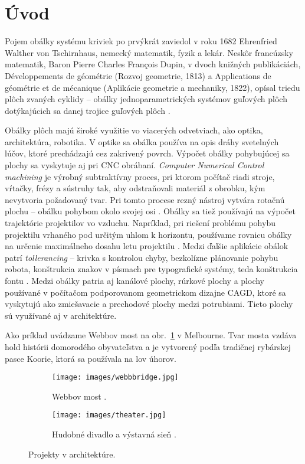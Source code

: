 \chapter*{Úvod} %
Pojem obálky systému kriviek po prvýkrát zaviedol v roku 1682 Ehrenfried Walther von Tschirnhaus, nemecký matematik, fyzik a lekár. Neskôr francúzsky matematik, Baron Pierre Charles François Dupin, v dvoch knižných publikáciách, Développements de géométrie (Rozvoj geometrie, 1813) a Applications de géométrie et de mécanique (Aplikácie geometrie a mechaniky, 1822), opísal triedu plôch zvaných cyklidy – obálky jednoparametrických systémov guľových plôch dotýkajúcich sa danej trojice guľových plôch \cite{Ciz2017}.

Obálky plôch majú široké využitie vo viacerých odvetviach, ako optika, architektúra, robotika. V optike sa obálka používa na opis dráhy svetelných lúčov, ktoré prechádzajú cez zakrivený povrch. Výpočet obálky pohybujúcej sa plochy sa vyskytuje aj pri CNC obrábaní. \textit{Computer Numerical Control machining} je výrobný subtraktívny proces, pri ktorom počítač riadi stroje, vŕtačky, frézy a sústruhy tak, aby odstraňovali materiál z obrobku, kým nevytvoria požadovaný tvar. Pri tomto procese rezný nástroj vytvára rotačnú plochu – obálku pohybom okolo svojej osi \cite{Skop20}. Obálky sa tiež používajú na výpočet trajektórie projektilov vo vzduchu. Napríklad, pri riešení problému pohybu projektilu vrhaného pod určitým uhlom k horizontu, používame rovnicu obálky na určenie maximálneho dosahu letu projektilu \cite{Chud09}. Medzi ďalšie aplikácie obálok patrí \textit{tollerancing} – krivka s kontrolou chyby, bezkolízne plánovanie pohybu robota, konštrukcia znakov v písmach pre typografické systémy, teda konštrukcia fontu \cite{Pott09}. Medzi obálky patria aj kanálové plochy, rúrkové plochy a plochy používané v počítačom podporovanom geometrickom dizajne CAGD, ktoré sa vyskytujú ako zmiešavacie a prechodové plochy medzi potrubiami. Tieto plochy sú využívané aj v architektúre.

Ako príklad uvádzame Webbov most na obr.~\ref{fig:webb_bridge} v Melbourne. Tvar mosta vzdáva hold histórii domorodého obyvateľstva a je vytvorený podľa tradičnej rybárskej pasce Koorie, ktorá sa používala na lov úhorov.

\begin{figure}[h]
    \centering
    \begin{subfigure}[b]{0.6\textwidth}
        \centering
        \texttt{[image: images/webbbridge.jpg]}
        \caption[Webbov most.]{Webbov most \cite{WebbBridge}.}
        \label{fig:webb_bridge}
    \end{subfigure}
    \hfill
    \begin{subfigure}[b]{0.6\textwidth}
        \centering
        \texttt{[image: images/theater.jpg]}
        \caption[Hudobné divadlo a výstavná sieň.]{Hudobné divadlo a výstavná sieň \cite{MusicTheater}.}
        \label{fig:theater}
    \end{subfigure}
    \caption{Projekty v architektúre.}
    \label{fig:projects}
\end{figure}

